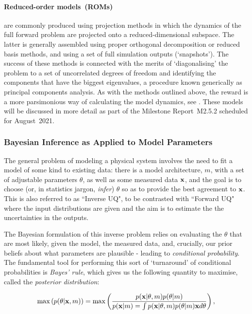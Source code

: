 \paragraph{Reduced-order models~(ROMs)} are commonly produced using projection methods in which the dynamics of the
full forward problem are projected onto a reduced-dimensional subspace.  
The latter is generally assembled using proper orthogonal decomposition or reduced basis methods, 
and using a set of full simulation outputs (`snapshots').  
The success of these methods is connected with the merits of `diagonalising' the problem to a set 
of uncorrelated degrees of freedom and identifying the components that have the biggest 
eigenvalues, a procedure known generically as principal components analysis.  
As with the methods outlined above, the reward is a more parsimonious way of calculating the model 
dynamics, see \cite{MORwiki}. These models will be discussed in more detail as part of the
Milestone Report~M2.5.2 scheduled for August~2021.

\subsubsection{Bayesian Inference as Applied to Model Parameters}\label{sec:Bayes}

The general problem of modeling a physical system involves the need to fit a model of some kind to 
existing data: there is a model architecture, $m$, with a set of adjustable parameters $\theta$, 
as well as some measured data $\mathbf{x}$, and the goal is to choose (or, in statistics jargon, {\it 
infer}) $\theta$ so as to provide the best agreement to $\mathbf{x}$.
This is also referred to as ``Inverse UQ", to be contrasted with 
``Forward UQ"  where the input distributions are given 
and the aim is to estimate the the uncertainties in the outputs.

The Bayesian formulation of this inverse problem relies on evaluating the $\theta$ that are most 
likely, given the model, the measured data, and, crucially, our prior beliefs about what parameters 
are plausible - leading to {\it conditional probability}.  
The fundamental tool for performing this sort of `turnaround' of conditional probabilities is {\it 
Bayes' rule}, which gives us the following quantity to maximise, called the {\it posterior 
distribution}:

\begin{equation}
\mathrm{max} \left ( p (\theta | \mathbf{x},m) \right ) = \mathrm{max} \left ( 
\frac{p(\mathbf{x}|\theta,m)p(\theta|m) }{p(\mathbf{x}|m) = \int p(\mathbf{x}|\theta,m) p(\theta|m) \mathbf{x} d\theta} \right ),
\end{equation} 

